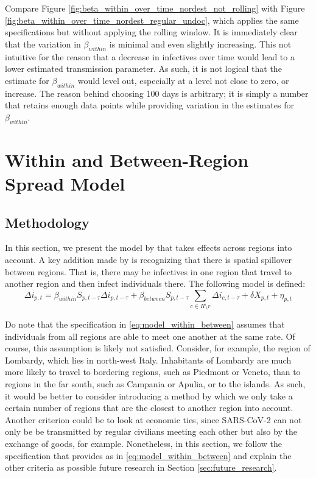 \documentclass[12pt]{article}
\begin{document}
	Compare Figure \ref{fig:beta_within_over_time_nordest_not_rolling} with Figure \ref{fig:beta_within_over_time_nordest_regular_undoc}, which applies the same specifications but without applying the rolling window. It is immediately clear that the variation in $\beta_{within}$ is minimal and even slightly increasing. This not intuitive for the reason that a decrease in infectives over time would lead to a lower estimated transmission parameter. As such, it is not logical that the estimate for $\beta_{within}$ would level out, especially at a level not close to zero, or increase. The reason behind choosing 100 days is arbitrary; it is simply a number that retains enough data points while providing variation in the estimates for $\beta_{within}$.
	
	\section{Within and Between-Region Spread Model} \label{sec:model_within_between}
	\subsection{Methodology} \label{subsec:model_within_between_methodology}
	In this section, we present the model by \textcite{adda2016economic} that takes effects across regions into account. A key addition made by \textcite{adda2016economic} is recognizing that there is spatial spillover between regions. That is, there may be infectives in one region that travel to another region and then infect individuals there. The following model is defined:
	\begin{equation} \label{eq:model_within_between}
	    \Delta i_{p,t} = \beta_{within}S_{p,t-\tau}\Delta i_{p,t-\tau} + \beta_{between}S_{p,t-\tau} \sum_{c \in R \setminus r} \Delta i_{c, t-\tau} + \delta X_{p,t} + \eta_{p,t}
	\end{equation}
	
	Do note that the specification in \eqref{eq:model_within_between} assumes that individuals from all regions are able to meet one another at the same rate. Of course, this assumption is likely not satisfied. Consider, for example, the region of Lombardy, which lies in north-west Italy. Inhabitants of Lombardy are much more likely to travel to bordering regions, such as Piedmont or Veneto, than to regions in the far south, such as Campania or Apulia, or to the islands. As such, it would be better to consider introducing a method by which we only take a certain number of regions that are the closest to another region into account. Another criterion could be to look at economic ties, since SARS-CoV-2 can not only be be transmitted by regular civilians meeting each other but also by the exchange of goods, for example. Nonetheless, in this section, we follow the specification that \textcite{adda2016economic} provides as in \eqref{eq:model_within_between} and explain the other criteria as possible future research in Section \ref{sec:future_research}. \\
	
\end{document}
